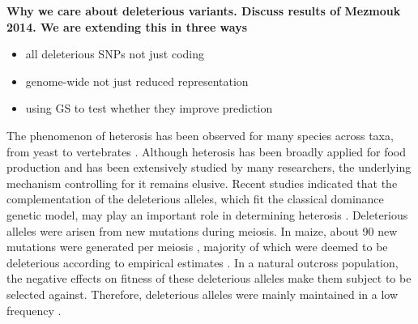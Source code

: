 \documentclass[10pt]{article}
\begin{document}

\textbf{Why we care about deleterious variants. Discuss results of Mezmouk 2014. We are extending this in three ways}  
\begin{itemize}
  \item all deleterious SNPs not just coding
  \item genome-wide not just reduced representation
  \item using GS to test whether they improve prediction
\end{itemize}



The phenomenon of heterosis has been observed for many species across taxa, from yeast \citep{Shapira2014} to vertebrates \citep{Gama2013}. Although heterosis has been broadly applied for food production and has been extensively studied by many researchers, the underlying mechanism controlling for it remains elusive. Recent studies indicated that the complementation of the deleterious alleles, which fit the classical dominance genetic model, may play an important role in determining heterosis \citep{Charlesworth2009}. Deleterious alleles were arisen from new mutations during meiosis. In maize, about 90 new mutations were generated per meiosis \citep{Clark2005}, majority of which were deemed to be deleterious according to empirical estimates \citep{Joseph2004}. In a natural outcross population, the negative effects on fitness of these deleterious alleles make them subject to be selected against. Therefore, deleterious alleles were mainly maintained in a low frequency \citep{Eyre-Walker2007}. 


\end{document}

